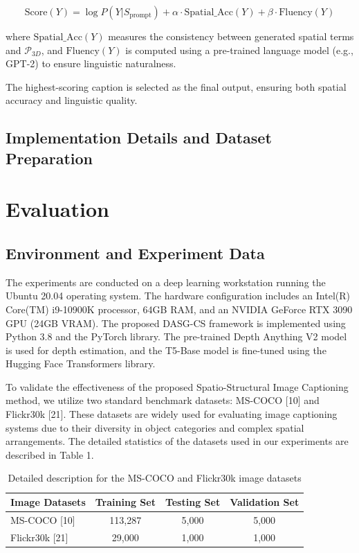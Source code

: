\documentclass[runningheads,14pt]{llncs}
\begin{document}
\begin{equation}
\text{Score}(Y) = \log P(Y|S_{\text{prompt}}) + \alpha \cdot \text{Spatial\_Acc}(Y) + \beta \cdot \text{Fluency}(Y)
\end{equation}

where $\text{Spatial\_Acc}(Y)$ measures the consistency between generated spatial terms and $\mathcal{P}_{3D}$, and $\text{Fluency}(Y)$ is computed using a pre-trained language model (e.g., GPT-2) to ensure linguistic naturalness.

The highest-scoring caption is selected as the final output, ensuring both spatial accuracy and linguistic quality.

\subsection{Implementation Details and Dataset Preparation}

\section{Evaluation}

\subsection{Environment and Experiment Data}
The experiments are conducted on a deep learning workstation running the Ubuntu 20.04 operating system. The hardware configuration includes an Intel(R) Core(TM) i9-10900K processor, 64GB RAM, and an NVIDIA GeForce RTX 3090 GPU (24GB VRAM). The proposed DASG-CS framework is implemented using Python 3.8 and the PyTorch library. The pre-trained Depth Anything V2 model is used for depth estimation, and the T5-Base model is fine-tuned using the Hugging Face Transformers library.

To validate the effectiveness of the proposed Spatio-Structural Image Captioning method, we utilize two standard benchmark datasets: MS-COCO [10] and Flickr30k [21]. These datasets are widely used for evaluating image captioning systems due to their diversity in object categories and complex spatial arrangements. The detailed statistics of the datasets used in our experiments are described in Table 1.

\begin{table}[h]
\centering
\caption{Detailed description for the MS-COCO and Flickr30k image datasets}
\label{tab:datasets}
\begin{tabular}{|l|c|c|c|}
\hline
\textbf{Image Datasets} & \textbf{Training Set} & \textbf{Testing Set} & \textbf{Validation Set} \\ \hline
MS-COCO [10]            & 113,287               & 5,000                & 5,000                   \\ \hline
Flickr30k [21]          & 29,000                & 1,000                & 1,000                   \\ \hline
\end{tabular}
\end{table}
\end{document}

